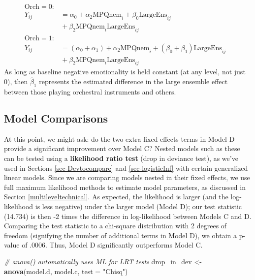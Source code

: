 \documentclass[
]{krantz}
\newenvironment{Shaded}{\begin{snugshade}}{\end{snugshade}}
\newcommand{\AttributeTok}[1]{\textcolor[rgb]{0.27,0.27,0.27}{#1}}
\newcommand{\CommentTok}[1]{\textcolor[rgb]{0.37,0.37,0.37}{\textit{#1}}}
\newcommand{\FunctionTok}[1]{\textcolor[rgb]{0.27,0.27,0.27}{\textbf{#1}}}
\newcommand{\NormalTok}[1]{#1}
\newcommand{\OtherTok}[1]{\textcolor[rgb]{0.37,0.37,0.37}{#1}}
\newcommand{\StringTok}[1]{\textcolor[rgb]{0.5,0.5,0.5}{#1}}
\begin{document}
\begin{align*}
\textrm{Orch}=0: & & \\
Y_{ij} & = \alpha_{0}+\alpha_{2}\textrm{MPQnem}_{i}+\beta_{0}\textrm{LargeEns}_{ij} \\
 & \textrm{} +\beta_{2}\textrm{MPQnem}_{i}\textrm{LargeEns}_{ij} \\
\textrm{Orch}=1: & \\
Y_{ij} & = (\alpha_{0}+\alpha_{1})+\alpha_{2}\textrm{MPQnem}_{i}+(\beta_{0}+\beta_{1})\textrm{LargeEns}_{ij} \\
 & \textrm{} +\beta_{2}\textrm{MPQnem}_{i}\textrm{LargeEns}_{ij}
\end{align*}
As long as baseline negative emotionality is held constant (at any level, not just 0), then \(\hat{\beta}_{1}\) represents the estimated difference in the large ensemble effect between those playing orchestral instruments and others.

\subsection{Model Comparisons}\label{compare:modeld}

At this point, we might ask: do the two extra fixed effects terms in Model D provide a significant improvement over Model C? Nested models such as these can be tested using a \textbf{likelihood ratio test}  (drop in deviance test),  as we've used in Sections \ref{sec-Devtocompare} and \ref{sec-logisticInf} with certain generalized linear models. Since we are comparing models nested in their fixed effects, we use full maximum likelihood methods to estimate model parameters, as discussed in Section \ref{multileveltechnical}. As expected, the likelihood is larger (and the log-likelihood is less negative) under the larger model (Model D); our test statistic (14.734) is then -2 times the difference in log-likelihood between Models C and D. Comparing the test statistic to a chi-square distribution with 2 degrees of freedom (signifying the number of additional terms in Model D), we obtain a p-value of .0006. Thus, Model D significantly outperforms Model C.

\begin{Shaded}
\begin{Highlighting}[]
\CommentTok{\# anova() automatically uses ML for LRT tests}
\NormalTok{drop\_in\_dev }\OtherTok{\textless{}{-}} \FunctionTok{anova}\NormalTok{(model.d, model.c, }\AttributeTok{test =} \StringTok{"Chisq"}\NormalTok{)}
\end{Highlighting}
\end{Shaded}
\end{document}
